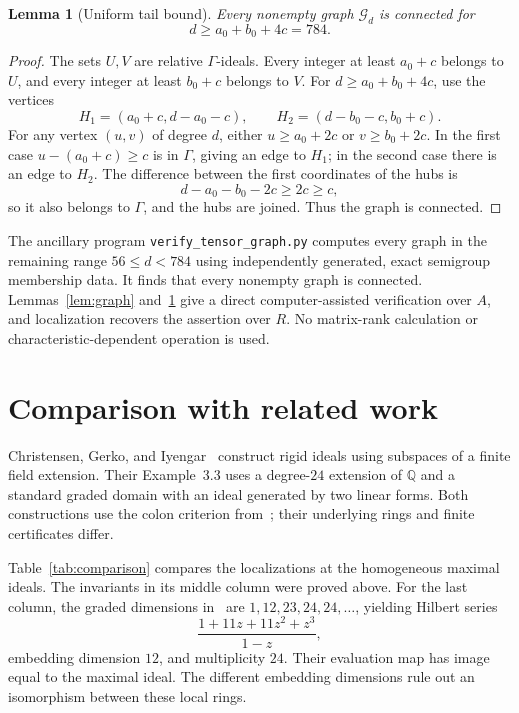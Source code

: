 \documentclass[11pt,letterpaper]{article}
\newtheorem{lemma}[theorem]{Lemma}
\theoremstyle{remark}
\newcommand{\QQ}{\mathbb Q}
\numberwithin{equation}{section}
\begin{document}
\begin{lemma}[Uniform tail bound]\label{lem:tail}
Every nonempty graph $\mathcal G_d$ is connected for
\[
 d\geq a_0+b_0+4c=784.
\]
\end{lemma}
\begin{proof}
The sets $U,V$ are relative $\Gamma$-ideals. Every integer at least $a_0+c$ belongs to $U$, and every integer at least $b_0+c$ belongs to $V$. For $d\geq a_0+b_0+4c$, use the vertices
\[
 H_1=(a_0+c,d-a_0-c),\qquad H_2=(d-b_0-c,b_0+c).
\]
For any vertex $(u,v)$ of degree $d$, either $u\geq a_0+2c$ or $v\geq b_0+2c$. In the first case $u-(a_0+c)\geq c$ is in $\Gamma$, giving an edge to $H_1$; in the second case there is an edge to $H_2$. The difference between the first coordinates of the hubs is
\[
 d-a_0-b_0-2c\geq2c\geq c,
\]
so it also belongs to $\Gamma$, and the hubs are joined. Thus the graph is connected.
\end{proof}

The ancillary program \texttt{verify\_tensor\_graph.py} computes every graph in the remaining range $56\leq d<784$ using independently generated, exact semigroup membership data. It finds that every nonempty graph is connected. Lemmas~\ref{lem:graph} and~\ref{lem:tail} give a direct computer-assisted verification over $A$, and localization recovers the assertion over $R$. No matrix-rank calculation or characteristic-dependent operation is used.

\section{Comparison with related work}\label{sec:comparison}
Christensen, Gerko, and Iyengar~\cite[Propositions~2.2 and~3.2]{CGI} construct rigid ideals using subspaces of a finite field extension. Their Example~3.3 uses a degree-$24$ extension of $\QQ$ and a standard graded domain with an ideal generated by two linear forms. Both constructions use the colon criterion from~\cite{HIW}; their underlying rings and finite certificates differ.

Table~\ref{tab:comparison} compares the localizations at the homogeneous maximal ideals. The invariants in its middle column were proved above. For the last column, the graded dimensions in~\cite[Example~3.3]{CGI} are $1,12,23,24,24,\ldots$, yielding Hilbert series
\[
 \frac{1+11z+11z^2+z^3}{1-z},
\]
embedding dimension $12$, and multiplicity $24$. Their evaluation map has image equal to the maximal ideal. The different embedding dimensions rule out an isomorphism between these local rings.
\end{document}
